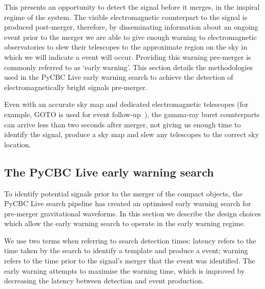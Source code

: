 This presents an opportunity to detect the \gwadj signal before it merges, in the inspiral regime of the system. The visible electromagnetic counterpart to the \gwadj signal is produced post-merger, therefore, by disseminating information about an ongoing \gwadj event prior to the merger we are able to give enough warning to electromagnetic observatories to slew their telescopes to the approximate region on the sky in which we will indicate a \gwadj event will occur. Providing this warning pre-merger is commonly referred to as `early warning'. This section details the methodologies used in the PyCBC Live early warning search to achieve the detection of electromagnetically bright \gwadj signals pre-merger.

Even with an accurate sky map and dedicated electromagnetic telescopes (for example, GOTO is used for \gwadj event follow-up~\cite{GOTO:2020}), the gamma-ray burst counterparts can arrive less than two seconds after merger, not giving us enough time to identify the signal, produce a sky map and slew any telescopes to the correct sky location.

\subsection{\label{6:sec:pycbc-ew-search}The PyCBC Live early warning search}

To identify potential \gwadj signals prior to the merger of the compact objects, the PyCBC Live search pipeline has created an optimised early warning search for pre-merger gravitational waveforms. In this section we describe the design choices which allow the early warning search to operate in the early warning regime.

We use two terms when referring to search detection times: latency refers to the time taken by the search to identify a \gwadj template and produce a \gwadj event; warning refers to the time prior to the \gwadj signal's merger that the event was identified. The early warning attempts to maximise the warning time, which is improved by decreasing the latency between detection and event production.

